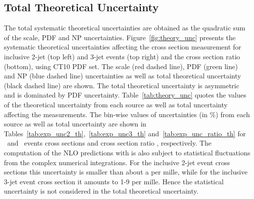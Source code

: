 \subsection{Total Theoretical Uncertainty}
The total systematic theoretical uncertainties are obtained as the quadratic sum of the scale, PDF and NP uncertainties. Figure~\ref{fig:theory_unc} presents the systematic theoretical uncertainties affecting the cross section measurement for inclusive 2-jet (top left) and 3-jet events (top right) and the cross section ratio \ratio (bottom), using CT10 PDF set. The scale (red dashed line), PDF (green line) and NP (blue dashed line) uncertainties as well as total theoretical uncertainty (black dashed line) are shown. The total theoretical uncertainty is asymmetric and is dominated by PDF uncertainty. Table~\ref{tab:theory_unc} quotes the values of the theoretical uncertainty from each source as well as total uncertainty affecting the measurements. The bin-wise values of uncertainties (in \%) from each source as well as total uncertainty are shown in Tables~\ref{tab:exp_unc2_th},~\ref{tab:exp_unc3_th} and~\ref{tab:exp_unc_ratio_th} for \njt~and \njth~events cross sections and cross section ratio \ratio, respectively. The computation of the NLO predictions with \NLOJETPP is also subject to statistical fluctuations from the complex numerical integrations. For the inclusive 2-jet event cross sections this uncertainty is smaller than about a per mille, while for the inclusive 3-jet event cross section it amounts to 1-9 per mille. Hence the statistical uncertainty is not considered in the total theoretical uncertainty.

